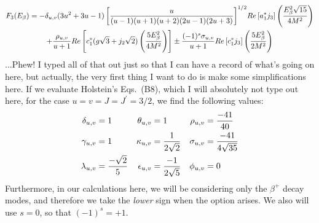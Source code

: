 %
\begin{multline}
F_3(E_{\beta}) = 
- \delta_{u,v} (3 u^2 + 3 u -1)
\left[
	\frac{u}{(u-1)(u+1)(u+2)(2u-1)(2u+3)}
\right]^{1/2}\!
Re \left[
	a_1^* j_3
\right]
\left( 
	\frac{E_{\beta}^2 \sqrt{15} }{4M^2}
\right)
\\
+ 
\frac{\rho_{u,v}}{u+1} 
Re\left[
	c_1^*(g\sqrt{3} + j_2\sqrt{2})
	\left(
		\frac{5 E_{\beta}^2}{4 M^2}
	\right)
\right]
\pm
\frac{(-1)^s \sigma_{u,v} }{u+1} 
Re \left[ c_1^*j_3 \right] 
\left( 
	\frac{5E_{\beta}^2}{2 M^2}
\right)
\end{multline}
...Phew!  I typed all of that out just so that I can have a record of what's going on here, but actually, the very first thing I want to do is make some simplifications here.  If we evaluate Holstein's Eqs.~(B8), which I will absolutely not type out here, for the case $u=v=J=J^\prime=3/2$, we find the following values:
\begin{align}
\deltauv     &= 1 
& \thetauv   &= 1 
& \rhouv     &= \frac{-41}{40}
	\nonumber\\
\gammauv     &= 1 
& \kappauv   &=\frac{1}{2\sqrt{2}} %
& \sigmauv   &= \frac{-41}{4\sqrt{35}}
	\nonumber\\
\lambdauv    &= \frac{-\sqrt{2} }{5} %
& \epsilonuv &= \frac{-1}{2\sqrt{5}}
& \phiuv     &= 0 %
	\nonumber\\
%
\end{align}
Furthermore, in our calculations here, we will be considering only the $\beta^+$ decay modes, and therefore we take the \emph{lower} sign when the option arises.  We also will use $s=0$, so that $(-1)^s = +1$.



